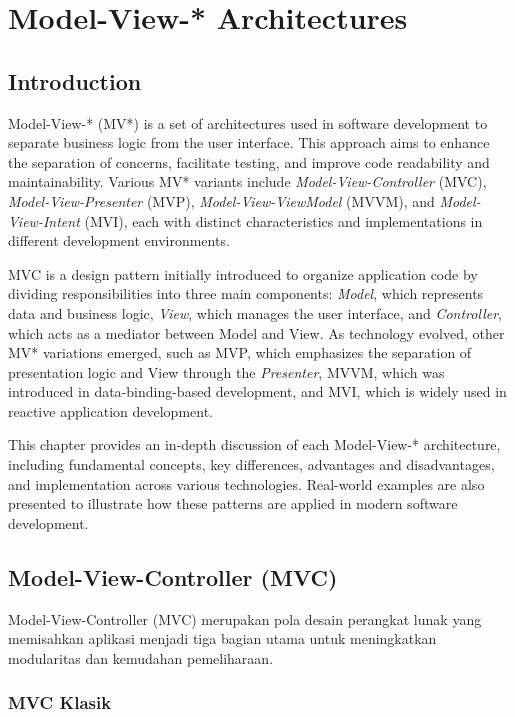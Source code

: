 \chapter{Model-View-* Architectures}

\section{Introduction}

Model-View-* (MV*) is a set of architectures used in software development to separate business logic from the user interface. This approach aims to enhance the separation of concerns, facilitate testing, and improve code readability and maintainability. Various MV* variants include \textit{Model-View-Controller} (MVC), \textit{Model-View-Presenter} (MVP), \textit{Model-View-ViewModel} (MVVM), and \textit{Model-View-Intent} (MVI), each with distinct characteristics and implementations in different development environments.

MVC is a design pattern initially introduced to organize application code by dividing responsibilities into three main components: \textit{Model}, which represents data and business logic, \textit{View}, which manages the user interface, and \textit{Controller}, which acts as a mediator between Model and View. As technology evolved, other MV* variations emerged, such as MVP, which emphasizes the separation of presentation logic and View through the \textit{Presenter}, MVVM, which was introduced in data-binding-based development, and MVI, which is widely used in reactive application development.

This chapter provides an in-depth discussion of each Model-View-* architecture, including fundamental concepts, key differences, advantages and disadvantages, and implementation across various technologies. Real-world examples are also presented to illustrate how these patterns are applied in modern software development.


\section{Model-View-Controller (MVC)}

Model-View-Controller (MVC) merupakan pola desain perangkat lunak yang memisahkan aplikasi menjadi tiga bagian utama untuk meningkatkan modularitas dan kemudahan pemeliharaan.

\subsection{MVC Klasik}

